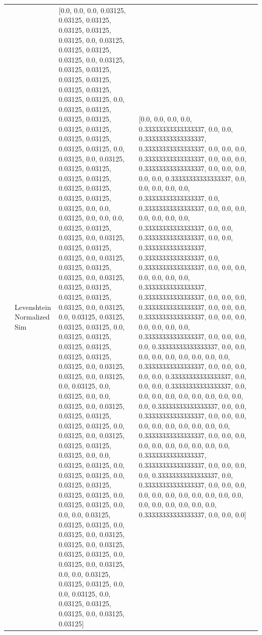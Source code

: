 \begin{tabular}{llll}
 & Levenshtein Normalized Sim & [0.0, 0.0, 0.0, 0.03125, 0.03125, 0.03125, 0.03125, 0.03125, 0.03125, 0.0, 0.03125, 0.03125, 0.03125, 0.03125, 0.0, 0.03125, 0.03125, 0.03125, 0.03125, 0.03125, 0.03125, 0.03125, 0.03125, 0.03125, 0.0, 0.03125, 0.03125, 0.03125, 0.03125, 0.03125, 0.03125, 0.03125, 0.03125, 0.03125, 0.03125, 0.0, 0.03125, 0.0, 0.03125, 0.03125, 0.03125, 0.03125, 0.03125, 0.03125, 0.03125, 0.03125, 0.03125, 0.03125, 0.0, 0.0, 0.03125, 0.0, 0.0, 0.0, 0.03125, 0.03125, 0.03125, 0.0, 0.03125, 0.03125, 0.03125, 0.03125, 0.0, 0.03125, 0.03125, 0.03125, 0.03125, 0.0, 0.03125, 0.03125, 0.03125, 0.03125, 0.03125, 0.03125, 0.0, 0.03125, 0.0, 0.03125, 0.03125, 0.03125, 0.03125, 0.0, 0.03125, 0.03125, 0.03125, 0.03125, 0.03125, 0.03125, 0.03125, 0.0, 0.03125, 0.03125, 0.0, 0.03125, 0.0, 0.03125, 0.0, 0.03125, 0.0, 0.0, 0.03125, 0.0, 0.03125, 0.03125, 0.03125, 0.03125, 0.03125, 0.0, 0.03125, 0.0, 0.03125, 0.03125, 0.03125, 0.03125, 0.0, 0.0, 0.03125, 0.03125, 0.0, 0.03125, 0.03125, 0.0, 0.03125, 0.03125, 0.03125, 0.03125, 0.0, 0.03125, 0.03125, 0.0, 0.0, 0.0, 0.03125, 0.03125, 0.03125, 0.0, 0.03125, 0.0, 0.03125, 0.03125, 0.0, 0.03125, 0.03125, 0.03125, 0.0, 0.03125, 0.0, 0.03125, 0.0, 0.0, 0.03125, 0.03125, 0.03125, 0.0, 0.0, 0.03125, 0.0, 0.03125, 0.03125, 0.03125, 0.0, 0.03125, 0.03125] & [0.0, 0.0, 0.0, 0.0, 0.33333333333333337, 0.0, 0.0, 0.33333333333333337, 0.33333333333333337, 0.0, 0.0, 0.0, 0.33333333333333337, 0.0, 0.0, 0.0, 0.33333333333333337, 0.0, 0.0, 0.0, 0.0, 0.0, 0.33333333333333337, 0.0, 0.0, 0.0, 0.0, 0.0, 0.33333333333333337, 0.0, 0.33333333333333337, 0.0, 0.0, 0.0, 0.0, 0.0, 0.0, 0.0, 0.33333333333333337, 0.0, 0.0, 0.33333333333333337, 0.0, 0.0, 0.33333333333333337, 0.33333333333333337, 0.0, 0.33333333333333337, 0.0, 0.0, 0.0, 0.0, 0.0, 0.0, 0.0, 0.33333333333333337, 0.33333333333333337, 0.0, 0.0, 0.0, 0.33333333333333337, 0.0, 0.0, 0.0, 0.33333333333333337, 0.0, 0.0, 0.0, 0.0, 0.0, 0.0, 0.0, 0.33333333333333337, 0.0, 0.0, 0.0, 0.0, 0.33333333333333337, 0.0, 0.0, 0.0, 0.0, 0.0, 0.0, 0.0, 0.0, 0.0, 0.33333333333333337, 0.0, 0.0, 0.0, 0.0, 0.0, 0.33333333333333337, 0.0, 0.0, 0.0, 0.33333333333333337, 0.0, 0.0, 0.0, 0.0, 0.0, 0.0, 0.0, 0.0, 0.0, 0.0, 0.33333333333333337, 0.0, 0.0, 0.33333333333333337, 0.0, 0.0, 0.0, 0.0, 0.0, 0.0, 0.0, 0.0, 0.0, 0.0, 0.33333333333333337, 0.0, 0.0, 0.0, 0.0, 0.0, 0.0, 0.0, 0.0, 0.0, 0.0, 0.33333333333333337, 0.33333333333333337, 0.0, 0.0, 0.0, 0.0, 0.33333333333333337, 0.0, 0.33333333333333337, 0.0, 0.0, 0.0, 0.0, 0.0, 0.0, 0.0, 0.0, 0.0, 0.0, 0.0, 0.0, 0.0, 0.0, 0.0, 0.0, 0.0, 0.33333333333333337, 0.0, 0.0, 0.0] \\

\end{tabular}
